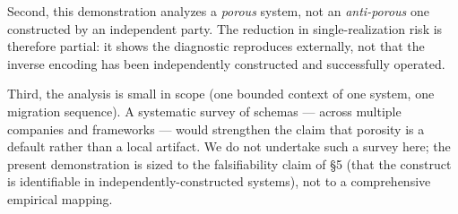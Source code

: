 \documentclass[
]{article}
\begin{document}
Second, this demonstration analyzes a \emph{porous} system, not an
\emph{anti-porous} one constructed by an independent party. The
reduction in single-realization risk is therefore partial: it shows the
diagnostic reproduces externally, not that the inverse encoding has been
independently constructed and successfully operated.

Third, the analysis is small in scope (one bounded context of one
system, one migration sequence). A systematic survey of schemas ---
across multiple companies and frameworks --- would strengthen the claim
that porosity is a default rather than a local artifact. We do not
undertake such a survey here; the present demonstration is sized to the
falsifiability claim of §5 (that the construct is identifiable in
independently-constructed systems), not to a comprehensive empirical
mapping.
\end{document}
